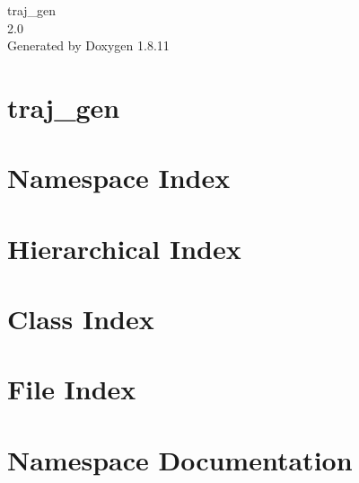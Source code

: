 \documentclass[twoside]{book}
\newcommand{\+}{\discretionary{\mbox{\scriptsize$\hookleftarrow$}}{}{}}
\newcommand{\clearemptydoublepage}{%
  \newpage{\pagestyle{empty}\cleardoublepage}%
}
\begin{document}
\hypersetup{pageanchor=false,
             bookmarksnumbered=true,
             pdfencoding=unicode
            }
\begin{titlepage}
\vspace*{7cm}
\begin{center}%
{\Large traj\+\_\+gen \\[1ex]\large 2.\+0 }\\
\vspace*{1cm}
{\large Generated by Doxygen 1.8.11}\\
\end{center}
\end{titlepage}
\clearemptydoublepage
\tableofcontents
\clearemptydoublepage
{}
\hypersetup{pageanchor=true}

\chapter{traj\+\_\+gen}
\label{md_README}
\hypertarget{md_README}{}

\chapter{Namespace Index}

\chapter{Hierarchical Index}

\chapter{Class Index}

\chapter{File Index}

\chapter{Namespace Documentation}

















\end{document}
